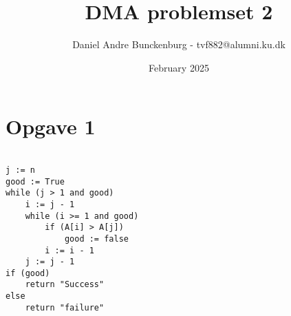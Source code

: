 \documentclass{article}
\title{DMA problemset 2}
\author{Daniel Andre Bunckenburg - tvf882@alumni.ku.dk}
\date{February 2025}
\begin{document}
\maketitle

\section{Opgave 1}



\begin{verbatim}

j := n
good := True
while (j > 1 and good) 
    i := j - 1
    while (i >= 1 and good)
        if (A[i] > A[j])
            good := false
        i := i - 1
    j := j - 1
if (good)
    return "Success"
else
    return "failure"

\end{verbatim}
\end{document}
